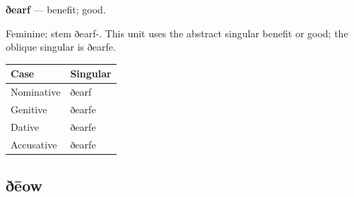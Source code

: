 \par\begin{minipage}{\linewidth}\raggedright
\textbf{ðearf} — benefit; good.

Feminine; stem ðearf-. This unit uses the abstract singular benefit or good; the oblique singular is ðearfe.

\par\begingroup
\fontsize{10.5}{13.2}\selectfont
\setlength{\LTleft}{0pt}\setlength{\LTright}{\fill}
\noindent
\begin{tabular}{@{}>{\raggedright\arraybackslash}p{60.59mm}>{\raggedright\arraybackslash}p{60.59mm}@{}}
\toprule
\textbf{Case} & \textbf{Singular} \\
\midrule
Nominative & ðearf \\
Genitive & ðearfe \\
Dative & ðearfe \\
Accusative & ðearfe \\
\bottomrule
\end{tabular}
\par\endgroup

\end{minipage}\par
{}
\subsection*{ðēow}

